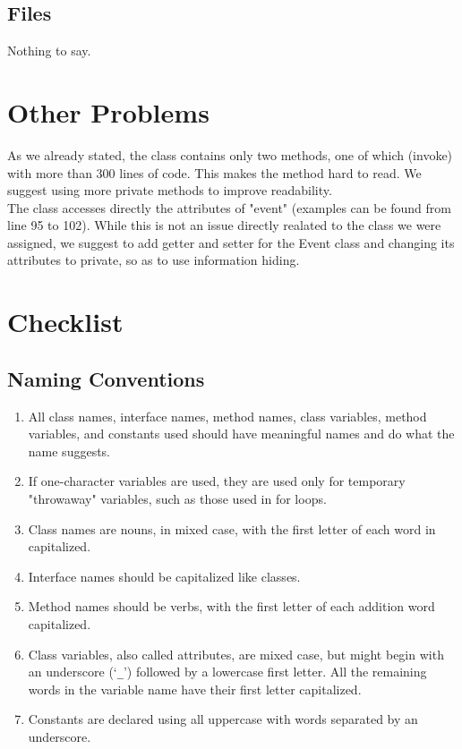 \documentclass{article}
\begin{document}
\subsection{Files}
Nothing to say.
\section{Other Problems}
As we already stated, the class contains only two methods, one of which (invoke) with more than 300 lines of code. This makes the method hard to read. We suggest using more private methods to improve readability.\\
The class accesses directly the attributes of "event" (examples can be found from line 95 to 102). While this is not an issue directly realated to the class we were assigned, we suggest to add getter and setter for the Event class and changing its attributes to private, so as to use information hiding.

\section{Checklist}
\subsection*{Naming Conventions}
\begin{enumerate}
\item All class names, interface names, method names, class variables, method variables, and constants used should have meaningful names and do what the name suggests.
\item If one-character variables are used, they are used only for temporary "throwaway" variables, such as those used in for loops.
\item Class names are nouns, in mixed case, with the first letter of each word in capitalized.
\item Interface names should be capitalized like classes.
\item Method names should be verbs, with the first letter of each addition word capitalized.
\item Class variables, also called attributes, are mixed case, but might begin with an underscore (`\texttt{\_}') followed by a lowercase first letter. All the remaining words in the variable name have their first letter capitalized.
\item Constants are declared using all uppercase with words separated by an underscore.
\end{enumerate}
\end{document}

